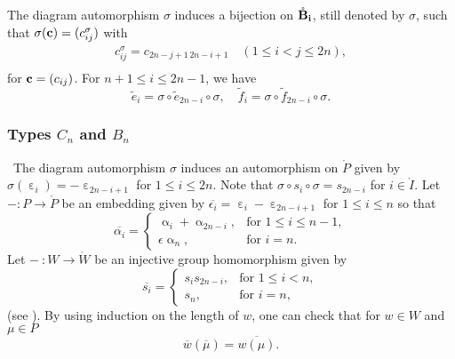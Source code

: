 \documentclass[leqno,11pt]{amsart}
\numberwithin{equation}{section}
\newcommand{\bs}{\boldsymbol}
\newcommand{\B}{\mathbf{B}}
\newcommand{\ov}{\overline}
\newcommand{\bi}{\bs{\rm i}}
\newcommand{\te}{\widetilde{e}}
\newcommand{\tf}{\widetilde{f}}
\begin{document}
The diagram automorphism $\sigma$ induces a bijection on $\mathring{\B}_{{\bi}}$, still denoted by $\sigma$, such that $\sigma({\bf c})=(c^\sigma_{ij})$ with 
\begin{equation}\label{eq:sigma on B(infty)}
\begin{split}
c^\sigma_{ij}=c_{2n-j+1\,2n-i+1}\quad (1\leq i<j\leq 2n),\\
\end{split}
\end{equation}
for ${\bf c}=(c_{ij})$.
For $n+1\leq i\leq 2n-1$, we have  
\begin{equation*}
\te_i = \sigma\circ \te_{2n-i}\circ \sigma,\quad \tf_i = \sigma\circ \tf_{2n-i}\circ \sigma.
\end{equation*}


\subsubsection{Types $C_n$ and $B_n$} \
The diagram automorphism $\sigma$ induces an automorphism on $\mathring{P}$ given by $\sigma(\upepsilon_i)=-\upepsilon_{2n-i+1}$ for $1\leq i\leq 2n$. Note that $\sigma\circ s_i \circ \sigma = s_{2n-i}$ for $i\in \mathring{I}$.
Let $- : P \longrightarrow \mathring{P}$ be an embedding given by $\ov{\epsilon_i}=\upepsilon_i-\upepsilon_{2n-i+1}$ for $1\leq i\leq n$ so that 
\begin{equation*}
\ov{\alpha_i} = 
\begin{cases}
\upalpha_i+\upalpha_{2n-i}, & \text{for $1\leq i\leq n-1$},\\
\epsilon\upalpha_n, & \text{for $i=n$}.
\end{cases}
\end{equation*}
Let $- \ : W \rightarrow \mathring{W}$ be an injective group homomorphism 
 given by 
\begin{equation*}
\ov{s_i}=
\begin{cases}
s_i s_{2n-i}, & \text{for $1\leq i<n$},\\
s_n, & \text{for $i=n$},
\end{cases}
\end{equation*}
(see \cite[Corollary 3.4]{FRS}).
By using induction on the length of $w$, one can check that for $w\in W$ and $\mu\in P$
\begin{equation}\label{eq:bar preserves w}
\ov{w}(\ov{\mu})=\ov{w(\mu)}.
\end{equation}
\end{document}
